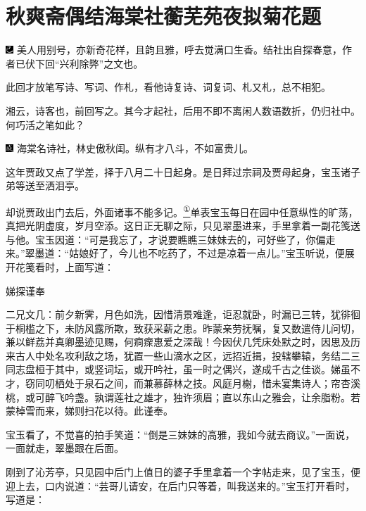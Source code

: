 

\chapter{秋爽斋偶结海棠社\hspace{.5em}蘅芜苑夜拟菊花题}

{\includegraphics[width=3mm]{../Images/00003}  \kaishu 美人用别号，亦新奇花样，且韵且雅，呼去觉满口生香。结社出自探春意，作者已伏下回``兴利除弊''之文也。}

{此回才放笔写诗、写词、作札，看他诗复诗、词复词、札又札，总不相犯。}

{湘云，诗客也，前回写之。其今才起社，后用不即不离闲人数语数折，仍归社中。何巧活之笔如此？}

{\includegraphics[width=3mm]{../Images/00005}  \kaishu 海棠名诗社，林史傲秋闺。纵有才八斗，不如富贵儿。}

这年贾政又点了学差，择于八月二十日起身。是日拜过宗祠及贾母起身，宝玉诸子弟等送至洒泪亭。

却说贾政出门去后，外面诸事不能多记。\href{../Text/part0041_split_000.html\#lnkback_1_a}{\textsuperscript{①}}单表宝玉每日在园中任意纵性的旷荡，真把光阴虚度，岁月空添。这日正无聊之际，只见翠墨进来，手里拿着一副花笺送与他。宝玉因道：``可是我忘了，才说要瞧瞧三妹妹去的，可好些了，你偏走来。''翠墨道：``姑娘好了，今儿也不吃药了，不过是凉着一点儿。''宝玉听说，便展开花笺看时，上面写道：

娣探谨奉

二兄文几：前夕新霁，月色如洗，因惜清景难逢，讵忍就卧，时漏已三转，犹徘徊于桐槛之下，未防风露所欺，致获采薪之患。昨蒙亲劳抚嘱，复又数遣侍儿问切，兼以鲜荔并真卿墨迹见赐，何痌瘝惠爱之深哉！今因伏几凭床处默之时，因思及历来古人中处名攻利敌之场，犹置一些山滴水之区，远招近揖，投辖攀辕，务结二三同志盘桓于其中，或竖词坛，或开吟社，虽一时之偶兴，遂成千古之佳谈。娣虽不才，窃同叨栖处于泉石之间，而兼慕薛林之技。风庭月榭，惜未宴集诗人；帘杏溪桃，或可醉飞吟盏。孰谓莲社之雄才，独许须眉；直以东山之雅会，让余脂粉。若蒙棹雪而来，娣则扫花以待。此谨奉。

宝玉看了，不觉喜的拍手笑道：``倒是三妹妹的高雅，我如今就去商议。''一面说，一面就走，翠墨跟在后面。

刚到了沁芳亭，只见园中后门上值日的婆子手里拿着一个字帖走来，见了宝玉，便迎上去，口内说道：``芸哥儿请安，在后门只等着，叫我送来的。''宝玉打开看时，写道是：

